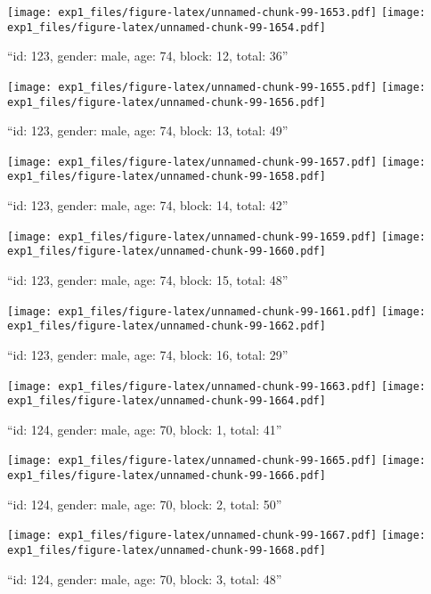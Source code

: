 \documentclass[,]{article}
\begin{document}
\texttt{[image: exp1\_files/figure-latex/unnamed-chunk-99-1653.pdf]}
\texttt{[image: exp1\_files/figure-latex/unnamed-chunk-99-1654.pdf]}

\newpage
[1] 

``id: 123, gender: male, age: 74, block: 12, total: 36''

\texttt{[image: exp1\_files/figure-latex/unnamed-chunk-99-1655.pdf]}
\texttt{[image: exp1\_files/figure-latex/unnamed-chunk-99-1656.pdf]}

\newpage
[1] 

``id: 123, gender: male, age: 74, block: 13, total: 49''

\texttt{[image: exp1\_files/figure-latex/unnamed-chunk-99-1657.pdf]}
\texttt{[image: exp1\_files/figure-latex/unnamed-chunk-99-1658.pdf]}

\newpage
[1] 

``id: 123, gender: male, age: 74, block: 14, total: 42''

\texttt{[image: exp1\_files/figure-latex/unnamed-chunk-99-1659.pdf]}
\texttt{[image: exp1\_files/figure-latex/unnamed-chunk-99-1660.pdf]}

\newpage
[1] 

``id: 123, gender: male, age: 74, block: 15, total: 48''

\texttt{[image: exp1\_files/figure-latex/unnamed-chunk-99-1661.pdf]}
\texttt{[image: exp1\_files/figure-latex/unnamed-chunk-99-1662.pdf]}

\newpage
[1] 

``id: 123, gender: male, age: 74, block: 16, total: 29''

\texttt{[image: exp1\_files/figure-latex/unnamed-chunk-99-1663.pdf]}
\texttt{[image: exp1\_files/figure-latex/unnamed-chunk-99-1664.pdf]}

\newpage
[1] 

``id: 124, gender: male, age: 70, block: 1, total: 41''

\texttt{[image: exp1\_files/figure-latex/unnamed-chunk-99-1665.pdf]}
\texttt{[image: exp1\_files/figure-latex/unnamed-chunk-99-1666.pdf]}

\newpage
[1] 

``id: 124, gender: male, age: 70, block: 2, total: 50''

\texttt{[image: exp1\_files/figure-latex/unnamed-chunk-99-1667.pdf]}
\texttt{[image: exp1\_files/figure-latex/unnamed-chunk-99-1668.pdf]}

\newpage
[1] 

``id: 124, gender: male, age: 70, block: 3, total: 48''
\end{document}
